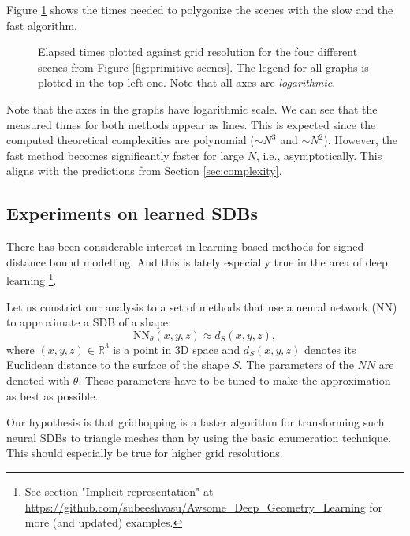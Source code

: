 \documentclass[11pt,twocolumn]{article}
\begin{document}
		Figure \ref{fig:times} shows the times needed to polygonize the scenes with the slow and the fast algorithm.
		\begin{figure}[ht]
			\centering
			
			\caption
			{
				Elapsed times plotted against grid resolution for the four different scenes from Figure \ref{fig:primitive-scenes}.
				The legend for all graphs is plotted in the top left one.
				Note that all axes are \textit{logarithmic}.
			}
			\label{fig:times}
		\end{figure}
		Note that the axes in the graphs have logarithmic scale.
		We can see that the measured times for both methods appear as lines.
		This is expected since the computed theoretical complexities are polynomial ($\sim N^3$ and $\sim N^2$).
		However, the fast method becomes significantly faster for large $N$, i.e., asymptotically.
		This aligns with the predictions from Section \ref{sec:complexity}.

		\subsection{Experiments on learned SDBs}\label{sec:experiments-learned}
		There has been considerable interest in learning-based methods for signed distance bound modelling.
		And this is lately especially true in the area of deep learning
		\cite{GenShapeCVPR2019,DeepShapeCVPR2019,davies2020overfit,hao2020dualsdf,SecretsOfWildSDFs2021,iccvw2021,stanfordgeom2021,asdf2021,takikawa2021nglod}\footnote{See section "Implicit representation" at \url{https://github.com/subeeshvasu/Awsome_Deep_Geometry_Learning} for more (and updated) examples.}.

		Let us constrict our analysis to a set of methods that use a neural network (NN) to approximate a SDB of a shape:
		\begin{equation}\label{eq:nnsdb}
			\text{NN}_\theta(x, y, z)\approx
			d_S(x, y, z)
			,
		\end{equation}
		where $(x, y, z)\in\mathbb{R}^3$ is a point in 3D space and $d_S(x, y, z)$ denotes its Euclidean distance to the surface of the shape $S$.
		The parameters of the $NN$ are denoted with $\theta$.
		These parameters have to be tuned to make the approximation as best as possible.

		Our hypothesis is that gridhopping is a faster algorithm for transforming such neural SDBs to triangle meshes than by using the basic enumeration technique.
		This should especially be true for higher grid resolutions.
\end{document}
